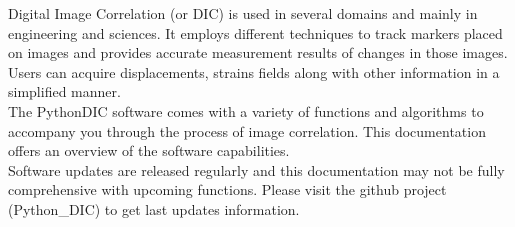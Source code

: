 \indent\indent Digital Image Correlation (or DIC) is used in several domains and mainly in engineering and sciences. It employs different techniques to track markers placed on images and provides accurate measurement results of changes in those images. Users can acquire displacements, strains fields along with other information in a simplified manner.\\
\newline
\indent The PythonDIC software comes with a variety of functions and algorithms to accompany you through the process of image correlation. This documentation offers an overview of the software capabilities.\\
\newline\indent Software updates are released regularly and this documentation may not be fully comprehensive with upcoming functions. Please visit the github project (Python\_DIC) to get last updates information.
